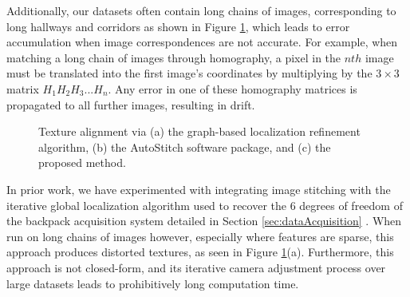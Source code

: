 \documentclass[]{spie}  %
\begin{document}
Additionally, our datasets often contain long chains of images,
corresponding to long hallways and corridors as shown in Figure
\ref{fig:mosaic3D}, which leads to error accumulation when image
correspondences are not accurate. For example, when matching a long
chain of images through homography, a pixel in the $nth$ image must be
translated into the first image's coordinates by multiplying by the
$3\times3$ matrix $H_1 H_2 H_3 ... H_n$. Any error in one of these
homography matrices is propagated to all further images, resulting in
drift.

\begin{figure}
  \centering {}

  \centering {}

  \centering {}

  \caption{Texture alignment via (a) the graph-based localization
    refinement algorithm, (b) the AutoStitch software package, and (c)
    the proposed method.}
  \label{fig:mosaic3D}
\end{figure}


In prior work, we have experimented with integrating image stitching
with the iterative global localization algorithm used to recover the 6
degrees of freedom of the backpack acquisition system detailed in
Section \ref{sec:dataAcquisition} \cite{liu2010indoor}. When run on
long chains of images however, especially where features are sparse,
this approach produces distorted textures, as seen in Figure
\ref{fig:mosaic3D}(a). Furthermore, this approach is not closed-form,
and its iterative camera adjustment process over large datasets leads
to prohibitively long computation time.
\end{document}
